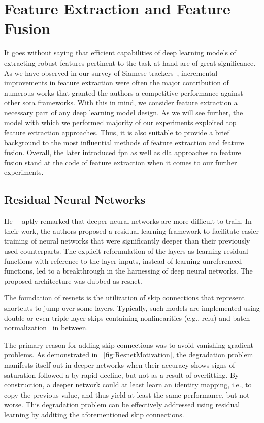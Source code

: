 \section{Feature Extraction and Feature Fusion}
\label{sec:FeatureExtractionFusion}

It goes without saying that efficient capabilities of deep learning models of extracting robust features pertinent to the task at hand are of great significance. As we have observed in our survey of Siamese trackers~\cite{ondrasovic2021siamese}, incremental improvements in feature extraction were often the major contribution of numerous works that granted the authors a competitive performance against other \gls{sota} frameworks. With this in mind, we consider feature extraction a necessary part of any deep learning model design. As we will see further, the model with which we performed majority of our experiments exploited top feature extraction approaches. Thus, it is also suitable to provide a brief background to the most influential methods of feature extraction and feature fusion. Overall, the later introduced \gls{fpn} as well as \gls{dla} approaches to feature fusion stand at the code of feature extraction when it comes to our further experiments.

\subsection{Residual Neural Networks}
\label{ssec:ResidualNeuralNetworks}

He~\etal{}~\cite{he2015resnet} aptly remarked that deeper neural networks are more difficult to train. In their work, the authors proposed a residual learning framework to facilitate easier training of neural networks that were significantly deeper than their previously used counterparts. The explicit reformulation of the layers as learning residual functions with reference to the layer inputs, instead of learning unreferenced functions, led to a breakthrough in the harnessing of deep neural networks. The proposed architecture was dubbed as \gls{resnet}.

The foundation of \glspl{resnet} is the utilization of skip connections that represent shortcuts to jump over some layers. Typically, such models are implemented using double or even triple layer skips containing nonlinearities (e.g., \gls{relu}) and batch normalization~\cite{ioffe2015batchnorm} in between.

The primary reason for adding skip connections was to avoid vanishing gradient problems. As demonstrated in \figstr{}~\ref{fig:ResnetMotivation}, the degradation problem manifests itself out in deeper networks when their accuracy shows signs of saturation followed a by rapid decline, but not as a result of overfitting. By construction, a deeper network could at least learn an identity mapping, i.e., to copy the previous value, and thus yield at least the same performance, but not worse. This degradation problem can be effectively addressed using residual learning by additing the aforementioned skip connections.

